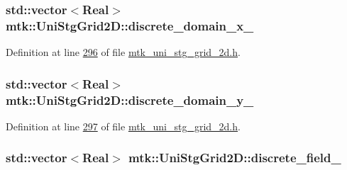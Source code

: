\hypertarget{classmtk_1_1UniStgGrid2D_ab15979865852583a46662ea592f27a4f}{
\subsubsection[{discrete\+\_\+domain\+\_\+x\+\_\+}]{\setlength{\rightskip}{0pt plus 5cm}std\+::vector$<${\bf Real}$>$ mtk\+::\+Uni\+Stg\+Grid2\+D\+::discrete\+\_\+domain\+\_\+x\+\_\+\hspace{0.3cm}{\ttfamily [private]}}}\label{classmtk_1_1UniStgGrid2D_ab15979865852583a46662ea592f27a4f}


Definition at line \hyperlink{mtk__uni__stg__grid__2d_8h_source_l00296}{296} of file \hyperlink{mtk__uni__stg__grid__2d_8h_source}{mtk\+\_\+uni\+\_\+stg\+\_\+grid\+\_\+2d.\+h}.

\hypertarget{classmtk_1_1UniStgGrid2D_ad69f93d4b27707d97f209b907383a7a2}{
\subsubsection[{discrete\+\_\+domain\+\_\+y\+\_\+}]{\setlength{\rightskip}{0pt plus 5cm}std\+::vector$<${\bf Real}$>$ mtk\+::\+Uni\+Stg\+Grid2\+D\+::discrete\+\_\+domain\+\_\+y\+\_\+\hspace{0.3cm}{\ttfamily [private]}}}\label{classmtk_1_1UniStgGrid2D_ad69f93d4b27707d97f209b907383a7a2}


Definition at line \hyperlink{mtk__uni__stg__grid__2d_8h_source_l00297}{297} of file \hyperlink{mtk__uni__stg__grid__2d_8h_source}{mtk\+\_\+uni\+\_\+stg\+\_\+grid\+\_\+2d.\+h}.

\hypertarget{classmtk_1_1UniStgGrid2D_ad7474b2669ee988b84aed20b7f5dc7be}{
\subsubsection[{discrete\+\_\+field\+\_\+}]{\setlength{\rightskip}{0pt plus 5cm}std\+::vector$<${\bf Real}$>$ mtk\+::\+Uni\+Stg\+Grid2\+D\+::discrete\+\_\+field\+\_\+\hspace{0.3cm}{\ttfamily [private]}}}\label{classmtk_1_1UniStgGrid2D_ad7474b2669ee988b84aed20b7f5dc7be}


